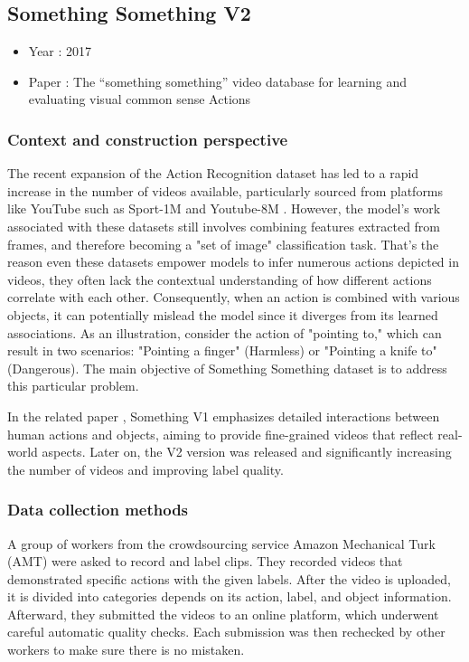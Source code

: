 \documentclass[10pt,onecolumn,letterpaper]{article}
\begin{document}
\subsection{Something Something V2}

\begin{itemize}
	\item Year : 2017
	\item Paper : The “something something” video database for learning and evaluating visual common sense
	Actions \cite{somethingsomething}
\end{itemize}

\subsubsection{\textbf{Context and construction perspective}}

The recent expansion of the Action Recognition dataset has led to a rapid increase in the number of videos available, particularly sourced from platforms like YouTube such as Sport-1M \cite{Sports1M} and Youtube-8M \cite{YouTube8M}. However, the model's work associated with these datasets still involves combining features extracted from frames, and therefore becoming a "set of image" classification task. That's the reason even these datasets empower models to infer numerous actions depicted in videos, they often lack the contextual understanding of how different actions correlate with each other. Consequently, when an action is combined with various objects, it can potentially mislead the model since it diverges from its learned associations. As an illustration, consider the action of "pointing to," which can result in two scenarios: "Pointing a finger" (Harmless) or "Pointing a knife to" (Dangerous). The main objective of Something Something dataset is to address this particular problem.

In the related paper \cite{somethingsomething}, Something V1 emphasizes detailed interactions between human actions and objects, aiming to provide fine-grained videos that reflect real-world aspects. Later on, the V2 version was released and significantly increasing the number of videos and improving label quality.
\subsubsection{Data collection methods}
A group of workers from the crowdsourcing service Amazon Mechanical Turk (AMT) were asked to record and label clips. They recorded videos that demonstrated specific actions with the given labels. After the video is uploaded, it is divided into categories depends on its action, label, and object information. Afterward, they submitted the videos to an online platform, which underwent careful automatic quality checks. Each submission was then rechecked by other workers to make sure there is no mistaken.
\end{document}
